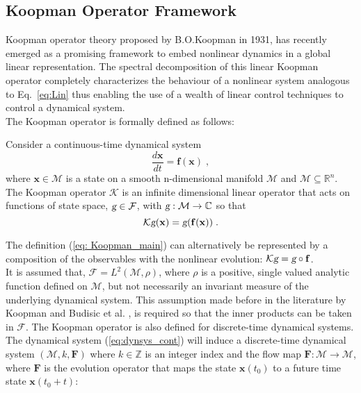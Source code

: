 \subsection{Koopman Operator Framework}
\label{sec:KO}
Koopman operator theory \cite{Koopman1931} proposed by B.O.Koopman in 1931, has recently emerged as a promising framework to embed nonlinear dynamics in a global linear representation. The spectral decomposition of this linear Koopman operator completely characterizes the behaviour of a nonlinear system analogous to Eq.~\ref{eq:Lin} \cite{spectral_NL} thus enabling the use of a wealth of linear control techniques to control a dynamical system.\\
The Koopman operator is formally defined as follows:
% 
\begin{definition}
Consider a continuous-time dynamical system
% 
\begin{equation}
\label{eq:dynsys_cont}
\frac{d\mathbf{x}}{dt} = \mathbf{f(x)} \;,
\end{equation}
% 
where $\mathbf{x} \in \mathcal{M}$ is a state on a smooth n-dimensional manifold $\mathcal{M}$ and $\mathcal{M}\subseteq \mathbb{R}^n$. The Koopman operator $\mathcal{K}$ is an infinite dimensional linear operator that acts on functions of state space, $\textsl{g} \in \mathcal{F}$, with $\textsl{g} : \mathcal{M}\rightarrow\mathbb{C}$ so that
% 
\begin{equation}
    \label{eq: Koopman_main}
    \mathcal{K}\textsl{g}(\mathbf{x}) = \textsl{g}(\mathbf{f(x)})\;.
\end{equation}
\end{definition}
% 
The definition (\ref{eq: Koopman_main}) can alternatively be represented by a composition of the observables with the nonlinear evolution: $ \mathcal{K}\textsl{g} = \textsl{g}\circ \mathbf{f}$.\\
It is assumed that, $\mathcal{F} = {L}^2(\mathcal{M,\rho})$, where $\rho$ is a positive, single valued analytic function defined on $\mathcal{M}$, but not necessarily an invariant measure of the underlying dynamical system. This assumption made before in the literature by Koopman \cite{Koopman1931} and Budisic et al. \cite{Applied_Koopmanism}, is required so that the inner products can be taken in $\mathcal{F}$. 
The Koopman operator is also defined for discrete-time dynamical systems. The dynamical system (\ref{eq:dynsys_cont}) will induce a discrete-time dynamical system $(\mathcal{M},k,\mathbf{F})$ where $k \in \mathbb{Z}$ is an integer index and the flow map $\mathbf{F} : \mathcal{M} \rightarrow \mathcal{M}$, where $\mathbf{F}$ is the evolution operator that maps the state $\mathbf{x}(t_0)$ to a future time state $\mathbf{x}(t_0+t)$:
